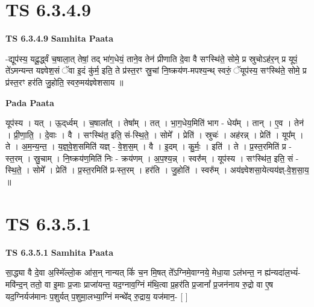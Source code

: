 \documentclass[17pt]{extarticle}
\begin{document}

\section{ TS 6.3.4.9 }

\textbf{TS 6.3.4.9 } \newline
\textbf{Samhita Paata} \newline

-द्यूप॑स्य॒ यदू॒र्द्ध्वं च॒षाला॒त् तेषां॒ तद् भा॑ग॒धेयं॒ ताने॒व तेन॑ प्रीणाति दे॒वा वै सꣳस्थि॑ते॒ सोमे॒ प्र स्रुचोऽह॑र॒न् प्र यूपं॒ ते॑ऽमन्यन्त यज्ञ्वेश॒सं ॅवा इ॒दं कु॑र्म॒ इति॒ ते प्र॑स्त॒रꣳ स्रु॒चां नि॒ष्क्रय॑ण-मपश्य॒न्थ् स्वरुं॒ ॅयूप॑स्य॒ सꣳस्थि॑ते॒ सोमे॒ प्र प्र॑स्त॒रꣳ हर॑ति जु॒होति॒ स्वरु॒मय॑ज्ञ्वेशसाय ॥ \newline

\textbf{Pada Paata} \newline

यूप॑स्य । यत् । ऊ॒द्‌र्ध्वम् । च॒षाला᳚त् । तेषा᳚म् । तत् । भा॒ग॒धेय॒मिति॑ भाग - धेय᳚म् । तान् । ए॒व । तेन॑ । प्री॒णा॒ति॒ । दे॒वाः । वै । सꣳस्थि॑त॒ इति॒ सं-स्थि॒ते॒ । सोमे᳚ । प्रेति॑ । स्रुचः॑ । अह॑रन्न् । प्रेति॑ । यूप᳚म् । ते । अ॒म॒न्य॒न्त॒ । य॒ज्ञ्॒वे॒श॒समिति॑ यज्ञ् - वे॒श॒स॒म् । वै । इ॒दम् । कु॒र्मः॒ । इति॑ । ते । प्र॒स्त॒रमिति॑ प्र - स्त॒रम् । स्रु॒चाम् । नि॒ष्क्रय॑ण॒मिति॑ निः - क्रय॑णम् । अ॒प॒श्य॒न्न् । स्वरु᳚म् । यूप॑स्य । सꣳस्थि॑त॒ इति॒ सं - स्थि॒ते॒ । सोमे᳚ । प्रेति॑ । प्र॒स्त॒रमिति॑ प्र-स्त॒रम् । हर॑ति । जु॒होति॑ । स्वरु᳚म् । अय॑ज्ञ्वेशसा॒येत्यय॑ज्ञ्-वे॒श॒सा॒य॒ ॥  \newline





\section{ TS 6.3.5.1 }

\textbf{TS 6.3.5.1 } \newline
\textbf{Samhita Paata} \newline

सा॒द्ध्या वै दे॒वा अ॒स्मिॅल्लो॒क आ॑स॒न् नान्यत् किं॑ च॒न मि॒षत् ते᳚ऽग्निमे॒वाग्नये॒ मेधा॒या ऽल॑भन्त॒ न ह्य॑न्यदा॑ल॒भ्यं॑-मवि॑न्द॒न् ततो॒ वा इ॒माः प्र॒जाः प्राजा॑यन्त॒ यद॒ग्नाव॒ग्निं म॑थि॒त्वा प्र॒हर॑ति प्र॒जानां᳚ प्र॒जन॑नाय रु॒द्रो वा ए॒ष यद॒ग्निर्यज॑मानः प॒शुर्यत् प॒शुमा॒लभ्या॒ग्निं मन्थे᳚द् रु॒द्राय॒ यज॑मान॒- [  ] \newline
\end{document}
